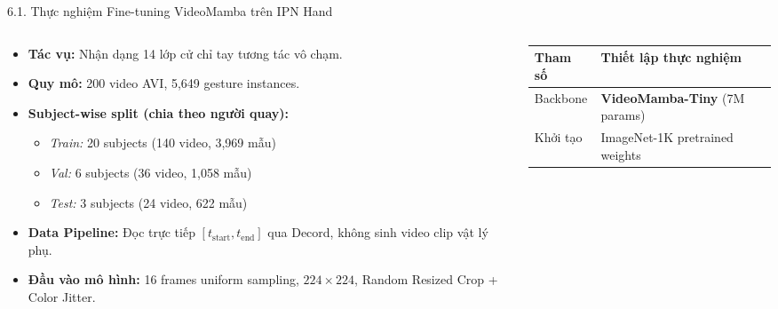 \documentclass[aspectratio=169,9pt]{beamer}
\newcommand{\tightitems}{\setlength{\itemsep}{0.13em}\setlength{\parskip}{0pt}\setlength{\parsep}{0pt}}
\begin{document}
\begin{frame}{6.1. Thực nghiệm Fine-tuning VideoMamba trên IPN Hand}
  \vspace{0.02cm}
  \begin{columns}[T,onlytextwidth]
    \begin{column}{0.48\textwidth}
      \begin{tcolorbox}[titlepanel,title=Tập dữ liệu IPN Hand (Subject-wise),equal height group=s6_1]
        {\fontsize{7.4}{8.7}\selectfont
        \begin{itemize}\tightitems
          \item \textbf{Tác vụ:} Nhận dạng 14 lớp cử chỉ tay tương tác vô chạm.
          \item \textbf{Quy mô:} 200 video AVI, 5,649 gesture instances.
          \item \textbf{Subject-wise split (chia theo người quay):}
            \begin{itemize}\tightitems
              \item \textit{Train:} 20 subjects (140 video, 3,969 mẫu)
              \item \textit{Val:} 6 subjects (36 video, 1,058 mẫu)
              \item \textit{Test:} 3 subjects (24 video, 622 mẫu)
            \end{itemize}
          \item \textbf{Data Pipeline:} Đọc trực tiếp $[t_{\text{start}}, t_{\text{end}}]$ qua Decord, không sinh video clip vật lý phụ.
          \item \textbf{Đầu vào mô hình:} 16 frames uniform sampling, $224\times 224$, Random Resized Crop + Color Jitter.
        \end{itemize}}
      \end{tcolorbox}
    \end{column}
    \begin{column}{0.48\textwidth}
      \begin{tcolorbox}[titlepanel,title=Cấu hình Huấn luyện chi tiết (Recipe),equal height group=s6_1]
        {\fontsize{7.1}{8.2}\selectfont
        \renewcommand{\arraystretch}{1.08}
        \begin{tabularx}{\linewidth}{@{}L{2.55cm}Y@{}}
          \toprule
          \textbf{Tham số} & \textbf{Thiết lập thực nghiệm}\\
          \midrule
          Backbone & \textbf{VideoMamba-Tiny} (7M params)\\
          Khởi tạo & ImageNet-1K pretrained weights\\

\end{tabularx}}
\end{tcolorbox}
\end{column}
\end{columns}
\end{frame}
\end{document}
